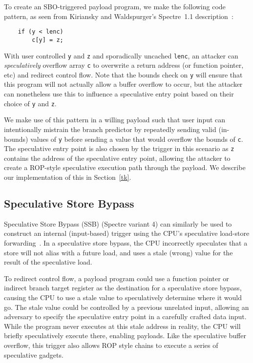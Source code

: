 
To create an SBO-triggered payload program, we make the following code pattern,
as seen from Kiriansky and Waldspurger's Spectre~1.1
description~\cite{kiransky2018speculative}:
\begin{lstlisting}
    if (y < lenc)
        c[y] = z;
\end{lstlisting}
With user controlled 
\texttt{y} and \texttt{z} and sporadically uncached \texttt{lenc}, an attacker 
can \textit{speculatively} overflow array \texttt{c}
to overwrite a return address (or function pointer, etc) and redirect control
flow. Note that the bounds check on \texttt{y} will ensure that this program
will not actually allow a buffer overflow to occur, but the attacker can
nonetheless use this to influence a speculative entry point based on their
choice of \texttt{y} and \texttt{z}.


We make use of this pattern in a willing payload such that user input can intentionally
mistrain the branch predictor by repeatedly sending valid (in-bounds) values of
\texttt{y} before sending a value that would overflow the bounds of \texttt{c}.
The speculative entry point is also chosen by the 
trigger in this scenario as \texttt{z} contains the address of the 
speculative entry point, allowing the attacker to create a ROP-style speculative 
execution path through the payload. We describe our implementation of this in
Section~\ref{tk}.


\subsection{Speculative Store Bypass}

Speculative Store Bypass (SSB) (Spectre variant 4) can similarly be used to
construct an internal (input-based) trigger using the CPU's speculative
load-store forwarding~\cite{spec-store-bypass}. In a speculative store bypass,
the CPU incorrectly speculates that a store will not alias with a future load,
and uses a stale (wrong) value for the result of the speculative load.


To redirect control flow, a payload program could use a function pointer or
indirect branch target register as the destination for a speculative store
bypass, causing the CPU to use a stale value to speculatively determine where it
would go. The stale value could be controlled by a previous unrelated input,
allowing an adversary to specify the speculative entry point in a carefully
crafted data input. While the program never
executes at this stale address in reality, the CPU will briefly speculatively
execute there, enabling \speculake payloads. Like the speculative buffer
overflow, this trigger also allows ROP style chains to execute a series of
speculative gadgets.


